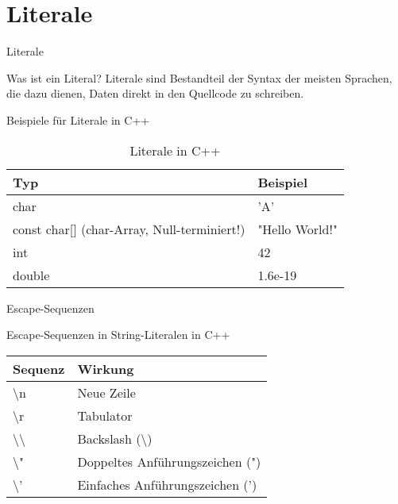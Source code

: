 \section{Literale}
\begin{frame}{Literale}
    \begin{block}{Was ist ein Literal?}
    Literale sind Bestandteil der Syntax der meisten Sprachen, die dazu dienen, Daten direkt in den Quellcode zu schreiben.
    \end{block}
    \pause
    \begin{block}{Beispiele für Literale in C++}
    \begin{table}
    \center
    \begin{tabular}{ll}
        \toprule
        Typ & Beispiel \\
        \midrule
        char & 'A' \\
        const char[] (char-Array, Null-terminiert!) & "Hello World!" \\
        int & 42 \\
        double & 1.6e-19 \\
        \bottomrule
    \end{tabular}
    \caption{Literale in C++}
    \end{table}
    \end{block}
\end{frame}

\begin{frame}{Escape-Sequenzen}
    \begin{block}{Escape-Sequenzen in String-Literalen in C++}
    \begin{table}
    \center
    \begin{tabular}{ll}
        \toprule
        Sequenz & Wirkung \\
        \midrule
        \textbackslash n & Neue Zeile \\
        \textbackslash r & Tabulator \\
        \textbackslash\textbackslash & Backslash (\textbackslash) \\
        \textbackslash" & Doppeltes Anführungszeichen (") \\
        \textbackslash' & Einfaches Anführungszeichen (') \\
        \bottomrule
    \end{tabular}
    \end{table}
    \end{block}
\end{frame}

